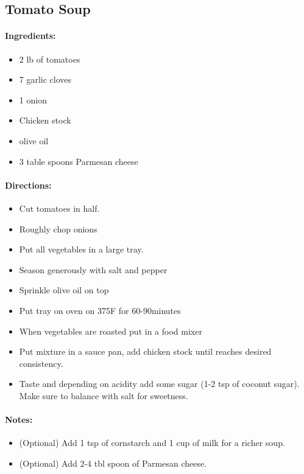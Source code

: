 \documentclass{article}
\begin{document}
\subsection{Tomato Soup}

\paragraph{Ingredients:}
\begin{itemize}
    \item 2 lb of tomatoes
    \item 7 garlic cloves
    \item 1 onion
    \item Chicken stock
    \item olive oil
    \item 3 table spoons Parmesan cheese
\end{itemize}

\paragraph{Directions:}
\begin{itemize}
    \item Cut tomatoes in half.
    \item Roughly chop onions
    \item Put all vegetables in a large tray.
    \item Season generously with salt and pepper
    \item Sprinkle olive oil on top
    \item Put tray on oven on 375F for 60-90minutes
    \item When vegetables are roasted put in a food mixer
    \item Put mixture in a sauce pan, add chicken stock until reaches desired consistency.
    \item Taste and depending on acidity add some sugar (1-2 tsp of coconut sugar). Make sure to balance with salt for sweetness.
\end{itemize}

\paragraph{Notes:}
\begin{itemize}
    \item (Optional) Add 1 tsp of cornstarch and 1 cup of milk for a richer soup.
    \item (Optional) Add 2-4 tbl spoon of Parmesan cheese.
\end{itemize}
\end{document}
